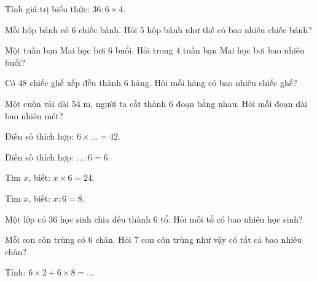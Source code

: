 \begin{ex}
Tính giá trị biểu thức: $36 : 6 \times 4$.
\end{ex}

\begin{ex}
Mỗi hộp bánh có 6 chiếc bánh. Hỏi 5 hộp bánh như thế có bao nhiêu chiếc bánh?
\end{ex}

\begin{ex}
Một tuần bạn Mai học bơi 6 buổi. Hỏi trong 4 tuần bạn Mai học bơi bao nhiêu buổi?
\end{ex}

\begin{ex}
Có 48 chiếc ghế xếp đều thành 6 hàng. Hỏi mỗi hàng có bao nhiêu chiếc ghế?
\end{ex}

\begin{ex}
Một cuộn vải dài 54 m, người ta cắt thành 6 đoạn bằng nhau. Hỏi mỗi đoạn dài bao nhiêu mét?
\end{ex}

\begin{ex}
Điền số thích hợp: $6 \times \dots = 42$.
\end{ex}

\begin{ex}
Điền số thích hợp: $\dots : 6 = 6$.
\end{ex}

\begin{ex}
Tìm $x$, biết: $x \times 6 = 24$.
\end{ex}

\begin{ex}
Tìm $x$, biết: $x : 6 = 8$.
\end{ex}

\begin{ex}
Một lớp có 36 học sinh chia đều thành 6 tổ. Hỏi mỗi tổ có bao nhiêu học sinh?
\end{ex}

\begin{ex}
Mỗi con côn trùng có 6 chân. Hỏi 7 con côn trùng như vậy có tất cả bao nhiêu chân?
\end{ex}

\begin{ex}
Tính: $6 \times 2 + 6 \times 8 = \dots$
\end{ex}

